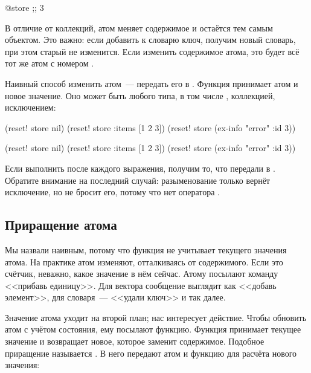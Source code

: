 
\begin{clojure}
@store ;; 3
\end{clojure}

В отличие от коллекций, атом меняет содержимое и остаётся тем самым
объектом. Это важно: если добавить к словарю ключ, получим новый словарь, при
этом старый не изменится. Если изменить содержимое атома, это будет всё тот
же атом с номером .


Наивный способ изменить атом~--- передать его в . Функция принимает атом
и новое значение. Оно может быть любого типа, в том числе ,
коллекцией, исключением:

\ifnarrow

\begin{clojure}
(reset! store nil)
(reset! store {:items [1 2 3]})
(reset! store (ex-info "error"
                {:id 3}))
\end{clojure}

\else

\begin{clojure}
(reset! store nil)
(reset! store {:items [1 2 3]})
(reset! store (ex-info "error" {:id 3}))
\end{clojure}

\fi

Если выполнить  после каждого выражения, получим то, что передали в
. Обратите внимание на последний случай: разыменование только
вернёт исключение, но не бросит его, потому что нет оператора .

\subsection{Приращение атома}


Мы назвали  наивным, потому что функция не учитывает текущего
значения атома. На практике атом изменяют, отталкиваясь от содержимого. Если это
счётчик, неважно, какое значение в нём сейчас. Атому посылают команду <<прибавь
единицу>>. Для вектора сообщение выглядит как <<добавь элемент>>, для
словаря~--- <<удали ключ>> и так далее.

Значение атома уходит на второй план; нас интересует действие. Чтобы обновить
атом с учётом состояния, ему посылают функцию. Функция принимает текущее
значение и возвращает новое, которое заменит содержимое. Подобное приращение
называется . В него передают атом и функцию для расчёта нового
значения:

